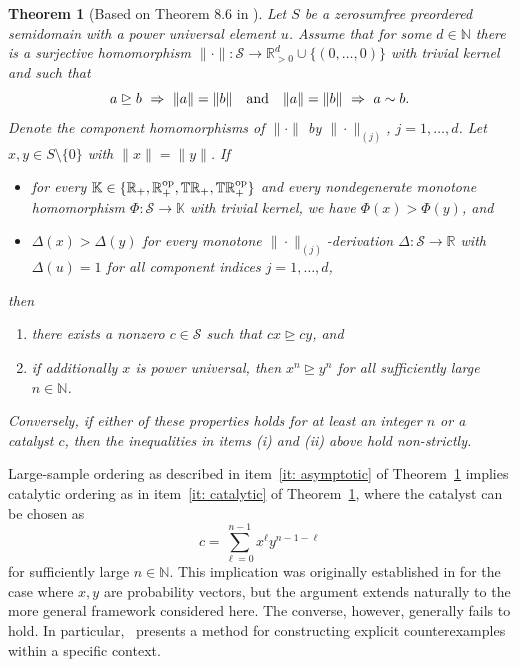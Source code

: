 \documentclass[aps,pra,11pt,onecolumn,nofootinbib,tightenlines]{revtex4-2}
\newtheorem{theorem}{Theorem}[section]
\theoremstyle{definition}
\newcommand{\cS}{\mathcal{S}}
\newcommand{\R}{\mathbb{R}}
\newcommand{\T}{\mathbb{T}}
\newcommand{\mb}[1]{\mathbb{#1}}
\newcommand{\rgeq}{\trianglerighteq}
\begin{document}
\begin{theorem}[Based on Theorem 8.6 in \cite{fritz2023abstractII}]\label{thm:Fritz2022}
Let $S$ be a zerosumfree preordered semidomain with a power universal element $u$. Assume that for some $d\in\mb N$ there is a surjective homomorphism $\|\cdot\|:\cS\to\R_{>0}^d\cup\{(0,\ldots,0)\}$ with trivial kernel and such that
\begin{equation}\label{eq:surjectivehomomorphismproperties}
a\rgeq b\ \Rightarrow\ \|a\|=\|b\|\quad {\rm and} \quad \|a\|=\|b\|\ \Rightarrow\ a\sim b.
\end{equation}
Denote the component homomorphisms of $\|\cdot\|$ by $\|\cdot\|_{(j)}$, $j=1,\ldots,d$. Let $x,y\in S\setminus\{0\}$ with $\|x\|=\|y\|$. If 
\begin{itemize}
\item[(i)] for every $\mb K\in\{\R_+,\R_+^{\rm op},\T\R_+,\T\R_+^{\rm op}\}$ and every nondegenerate monotone homomorphism $\Phi : \cS \to \mb K$ with trivial kernel, we have $\Phi(x) > \Phi(y)$, and
\item[(ii)] $\Delta(x) > \Delta(y)$ for every monotone $\|\cdot\|_{(j)}$-derivation $\Delta : \cS \to \R$ with $\Delta(u) = 1$ for all component indices $j = 1,\ldots,d$,
\end{itemize}
then
\begin{enumerate}[label=(\alph*),ref=2(\alph*)]
 \item there exists a nonzero $c\in \cS$ such that $cx\rgeq cy$, and 
\label{it: catalytic}
\item if additionally $x$ is power universal, then $x^n \rgeq y^n$ for all sufficiently large $n\in\mb N$. 
\label{it: asymptotic}
\end{enumerate}
Conversely, if either of these properties holds for at least an integer $n$ or a catalyst $c$, then the inequalities in items (i) and (ii) above hold non-strictly. 
\end{theorem}
Large-sample ordering as described in item~\ref{it: asymptotic} of Theorem~\ref{thm:Fritz2022} implies catalytic ordering as in item~\ref{it: catalytic} of Theorem~\ref{thm:Fritz2022}, where the catalyst can be chosen as
\begin{equation}
    c = \sum_{\ell=0}^{n-1} x^\ell y^{n-1-\ell}
\end{equation}
for sufficiently large $n \in \mathbb{N}$. This implication was originally established in \cite{duan2005multiple} for the case where $x, y$ are probability vectors, but the argument extends naturally to the more general framework considered here.
The converse, however, generally fails to hold. In particular,~\cite[Theorem 3]{feng2006relation} presents a method for constructing explicit counterexamples within a specific context.
\end{document}
